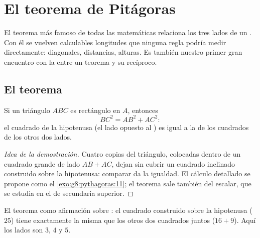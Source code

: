 \chapter{El teorema de Pitágoras}\label{ch:g8:pythagoras}

El teorema más famoso de todas las matemáticas relaciona los tres lados de
un . Con él se vuelven calculables longitudes que ninguna regla
podría medir directamente: diagonales, distancias, alturas. Es también nuestro
primer gran encuentro con la  entre un teorema y su
recíproco.

\section{El teorema}

\begin{theorem}[Pitágoras]\label{thm:g8:pythagoras:direct}
Si un triángulo $ABC$ es rectángulo en $A$, entonces
\[
BC^2 = AB^2 + AC^2 :
\]
el cuadrado de la hipotenusa (el lado opuesto al )
es igual a la  de los cuadrados de los otros dos lados.
\end{theorem}

\begin{proof}[Idea de la demostración]
Cuatro copias del triángulo, colocadas dentro de un cuadrado grande de lado
$AB + AC$, dejan sin cubrir un cuadrado inclinado construido sobre la hipotenusa:
comparar  da la igualdad. El cálculo detallado se
propone como el \cref{exo:g8:pythagoras:11}; el teorema sale también
del  escalar, que se estudia en el  de secundaria superior.
\end{proof}

\begin{omfigure}

{\small El teorema como afirmación sobre : el cuadrado construido sobre la
hipotenusa ($25$) tiene exactamente la misma  que los otros dos cuadrados
juntos ($16 + 9$). Aquí los lados son $3$, $4$ y $5$.}
\end{omfigure}

